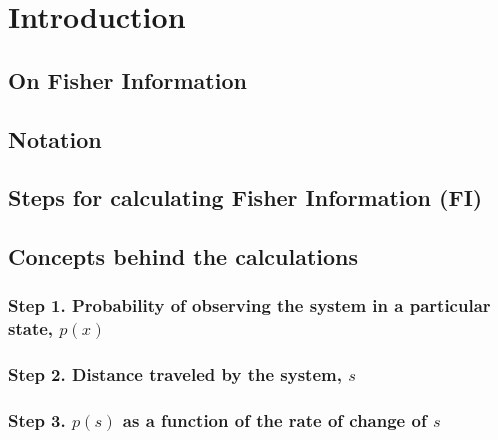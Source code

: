 \documentclass[12pt,twoside,openany]{reedthesis}
\begin{document}
\section{Introduction}\label{introduction-1}

\subsection{On Fisher Information}\label{on-fisher-information}

\subsection{Notation}\label{notation}

\subsection{Steps for calculating Fisher Information
(FI)}\label{steps-for-calculating-fisher-information-fi}

\subsection{Concepts behind the
calculations}\label{concepts-behind-the-calculations}

\subsubsection{\texorpdfstring{\textbf{Step 1. Probability of observing
the system in a particular state,
\(p(x)\)}}{Step 1. Probability of observing the system in a particular state, p(x)}}\label{step-1.-probability-of-observing-the-system-in-a-particular-state-px}

\subsubsection{\texorpdfstring{\textbf{Step 2.} Distance traveled by the
system,
\(s\)}{Step 2. Distance traveled by the system, s}}\label{step-2.-distance-traveled-by-the-system-s}

\subsubsection{\texorpdfstring{\textbf{Step 3.} \(p(s)\) as a function
of the rate of change of
\(s\)}{Step 3. p(s) as a function of the rate of change of s}}\label{step-3.-ps-as-a-function-of-the-rate-of-change-of-s}
\end{document}
